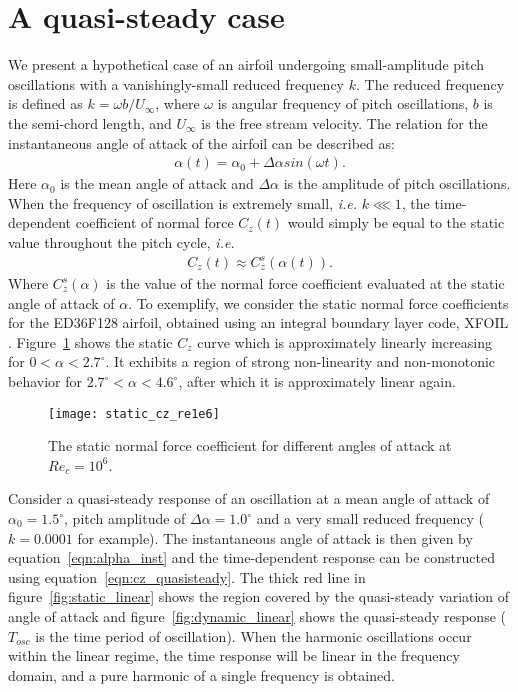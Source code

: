 \section{A quasi-steady case}
We present a hypothetical case of an airfoil undergoing small-amplitude pitch oscillations with a vanishingly-small reduced frequency $k$. The reduced frequency is defined as $k = \omega b/U_{\infty}$, where $\omega$ is angular frequency of pitch oscillations, $b$ is the semi-chord length, and $U_{\infty}$ is the free stream velocity. The relation for the instantaneous angle of attack of the airfoil can be described as:
\begin{align}
\alpha(t) = \alpha_{0} + \Delta\alpha sin(\omega t).
\label{eqn:alpha_inst}
\end{align}
Here $\alpha_{0}$ is the mean angle of attack and $\Delta\alpha$ is the amplitude of pitch oscillations. When the frequency of oscillation is extremely small, \textit{i.e.} $k\lll1$, the time-dependent coefficient of normal force $C_{z}(t)$ would simply be equal to the static value throughout the pitch cycle, \textit{i.e.}
\begin{align}
	C_{z}(t) \approx C^{s}_{z}(\alpha(t)).
	\label{eqn:cz_quasisteady}
\end{align}
Where $C^{s}_{z}(\alpha)$ is the value of the normal force coefficient evaluated at the static angle of attack of $\alpha$. To exemplify, we consider the static normal force coefficients for the ED36F128 airfoil, obtained using an integral boundary layer code, XFOIL \citep{drela89}. Figure~\ref{fig:cz_static} shows the static $C_{z}$ curve which is approximately linearly increasing for $0<\alpha<2.7^{\circ}$. It exhibits a region of strong non-linearity and non-monotonic behavior for $2.7^{\circ}<\alpha<4.6^{\circ}$, after which it is approximately linear again.
\begin{figure}[h]
	\centering
	\texttt{[image: static\_cz\_re1e6]}
	\caption{The static normal force coefficient for different angles of attack at $Re_{c}=10^{6}$.}
	\label{fig:cz_static}
\end{figure}
Consider a quasi-steady response of an oscillation at a mean angle of attack of $\alpha_{0}=1.5^{\circ}$, pitch amplitude of $\Delta\alpha=1.0^{\circ}$ and a very small reduced frequency ($k=0.0001$ for example). The instantaneous angle of attack is then given by equation~\ref{eqn:alpha_inst} and the time-dependent response can be constructed using equation~\ref{eqn:cz_quasisteady}. The thick red line in figure~\ref{fig:static_linear} shows the region covered by the quasi-steady variation of angle of attack and figure~\ref{fig:dynamic_linear} shows the quasi-steady response ($T_{osc}$ is the time period of oscillation). When the harmonic oscillations occur within the linear regime, the time response will be linear in the frequency domain, and a pure harmonic of a single frequency is obtained.
